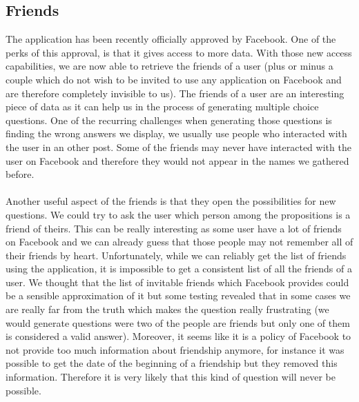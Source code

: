 \subsection{Friends}
The application has been recently officially approved by Facebook. One of the perks of this approval, is that it gives access to more data. With those new access capabilities, we are now able to retrieve the friends of a user (plus or minus a couple which do not wish to be invited to use any application on Facebook and are therefore completely invisible to us). The friends of a user are an interesting piece of data as it can help us in the process of generating multiple choice questions. One of the recurring challenges when generating those questions is finding the wrong answers we display, we usually use people who interacted with the user in an other post. Some of the friends may never have interacted with the user on Facebook and therefore they would not appear in the names we gathered before.\\\\
Another useful aspect of the friends is that they open the possibilities for new questions. We could try to ask the user which person among the propositions is a friend of theirs. This can be really interesting as some user have a lot of friends on Facebook and we can already guess that those people may not remember all of their friends by heart. Unfortunately, while we can reliably get the list of friends using the application, it is impossible to get a consistent list of all the friends of a user. We thought that the list of invitable friends which Facebook provides could be a sensible approximation of it but some testing revealed that in some cases we are really far from the truth which makes the question really frustrating (we would generate questions were two of the people are friends but only one of them is considered a valid answer). Moreover, it seems like it is a policy of Facebook to not provide too much information about friendship anymore, for instance it was possible to get the date of the beginning of a friendship but they removed this information. Therefore it is very likely that this kind of question will never be possible.
